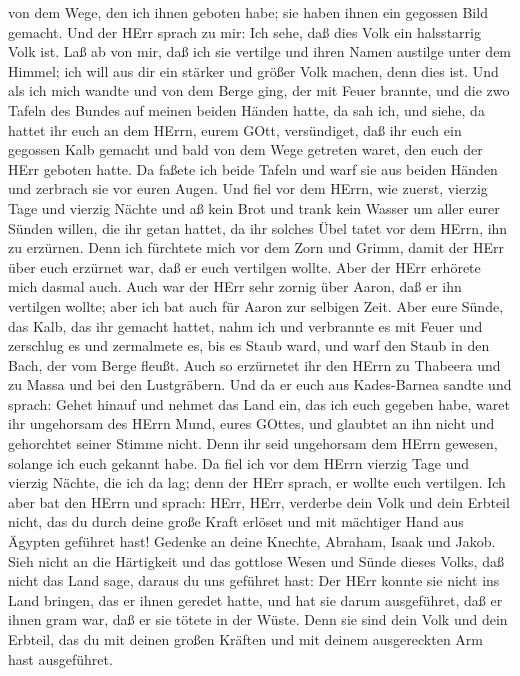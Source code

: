 von dem Wege, den ich ihnen geboten habe; sie haben ihnen ein gegossen
Bild gemacht.  Und der HErr sprach zu mir: Ich sehe, daß
dies Volk ein halsstarrig Volk ist.  Laß ab von mir, daß
ich sie vertilge und ihren Namen austilge unter dem Himmel; ich will aus
dir ein stärker und größer Volk machen, denn dies ist.  Und
als ich mich wandte und von dem Berge ging, der mit Feuer brannte, und
die zwo Tafeln des Bundes auf meinen beiden Händen hatte, 
da sah ich, und siehe, da hattet ihr euch an dem HErrn, eurem GOtt,
versündiget, daß ihr euch ein gegossen Kalb gemacht und bald von dem
Wege getreten waret, den euch der HErr geboten hatte.  Da
faßete ich beide Tafeln und warf sie aus beiden Händen und zerbrach sie
vor euren Augen.  Und fiel vor dem HErrn, wie zuerst,
vierzig Tage und vierzig Nächte und aß kein Brot und trank kein Wasser
um aller eurer Sünden willen, die ihr getan hattet, da ihr solches Übel
tatet vor dem HErrn, ihn zu erzürnen.  Denn ich fürchtete
mich vor dem Zorn und Grimm, damit der HErr über euch erzürnet war, daß
er euch vertilgen wollte. Aber der HErr erhörete mich dasmal auch.
 Auch war der HErr sehr zornig über Aaron, daß er ihn
vertilgen wollte; aber ich bat auch für Aaron zur selbigen Zeit.
 Aber eure Sünde, das Kalb, das ihr gemacht hattet, nahm
ich und verbrannte es mit Feuer und zerschlug es und zermalmete es, bis
es Staub ward, und warf den Staub in den Bach, der vom Berge fleußt.
 Auch so erzürnetet ihr den HErrn zu Thabeera und zu Massa
und bei den Lustgräbern.  Und da er euch aus Kades-Barnea
sandte und sprach: Gehet hinauf und nehmet das Land ein, das ich euch
gegeben habe, waret ihr ungehorsam des HErrn Mund, eures GOttes, und
glaubtet an ihn nicht und gehorchtet seiner Stimme nicht. 
Denn ihr seid ungehorsam dem HErrn gewesen, solange ich euch gekannt
habe.  Da fiel ich vor dem HErrn vierzig Tage und vierzig
Nächte, die ich da lag; denn der HErr sprach, er wollte euch vertilgen.
 Ich aber bat den HErrn und sprach: HErr, HErr, verderbe
dein Volk und dein Erbteil nicht, das du durch deine große Kraft erlöset
und mit mächtiger Hand aus Ägypten geführet hast!  Gedenke
an deine Knechte, Abraham, Isaak und Jakob. Sieh nicht an die Härtigkeit
und das gottlose Wesen und Sünde dieses Volks,  daß nicht
das Land sage, daraus du uns geführet hast: Der HErr konnte sie nicht
ins Land bringen, das er ihnen geredet hatte, und hat sie darum
ausgeführet, daß er ihnen gram war, daß er sie tötete in der Wüste.
 Denn sie sind dein Volk und dein Erbteil, das du mit
deinen großen Kräften und mit deinem ausgereckten Arm hast ausgeführet.

